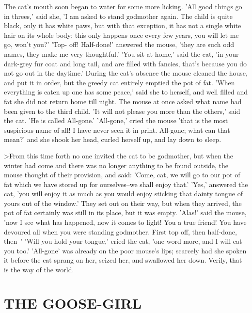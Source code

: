 \documentclass[12pt]{book}
\begin{document}
The cat's mouth soon began to water for some more licking. 'All good
things go in threes,' said she, 'I am asked to stand godmother again.
The child is quite black, only it has white paws, but with that
exception, it has not a single white hair on its whole body; this only
happens once every few years, you will let me go, won't you?' 'Top-
off! Half-done!' answered the mouse, 'they are such odd names, they
make me very thoughtful.' 'You sit at home,' said the cat, 'in your
dark-grey fur coat and long tail, and are filled with fancies, that's
because you do not go out in the daytime.' During the cat's absence
the mouse cleaned the house, and put it in order, but the greedy cat
entirely emptied the pot of fat. 'When everything is eaten up one has
some peace,' said she to herself, and well filled and fat she did not
return home till night. The mouse at once asked what name had been
given to the third child. 'It will not please you more than the
others,' said the cat. 'He is called All-gone.' 'All-gone,' cried the
mouse 'that is the most suspicious name of all! I have never seen it
in print. All-gone; what can that mean?' and she shook her head,
curled herself up, and lay down to sleep.

>From this time forth no one invited the cat to be godmother, but when
the winter had come and there was no longer anything to be found
outside, the mouse thought of their provision, and said: 'Come, cat,
we will go to our pot of fat which we have stored up for ourselves--we
shall enjoy that.' 'Yes,' answered the cat, 'you will enjoy it as much
as you would enjoy sticking that dainty tongue of yours out of the
window.' They set out on their way, but when they arrived, the pot of
fat certainly was still in its place, but it was empty. 'Alas!' said
the mouse, 'now I see what has happened, now it comes to light! You a
true friend! You have devoured all when you were standing godmother.
First top off, then half-done, then--' 'Will you hold your tongue,'
cried the cat, 'one word more, and I will eat you too.' 'All-gone' was
already on the poor mouse's lips; scarcely had she spoken it before
the cat sprang on her, seized her, and swallowed her down. Verily,
that is the way of the world.



\chapter{THE GOOSE-GIRL}
\end{document}
